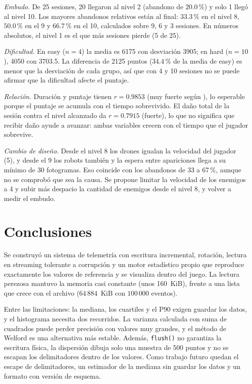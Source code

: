 \documentclass[conference]{IEEEtran}
\begin{document}
\emph{Embudo.} De 25 sesiones, 20 llegaron al nivel 2 (abandono de $20.0\,\%$) y solo 1 llegó al nivel 10. Los mayores abandonos relativos están al final: $33.3\,\%$ en el nivel 8, $50.0\,\%$ en el 9 y $66.7\,\%$ en el 10, calculados sobre 9, 6 y 3 sesiones. En números absolutos, el nivel 1 es el que más sesiones pierde (5 de 25).

\emph{Dificultad.} En easy ($n=4$) la media es 6175 con desviación 3905; en hard ($n=10$), 4050 con 3703.5. La diferencia de 2125 puntos ($34.4\,\%$ de la media de easy) es menor que la desviación de cada grupo, así que con 4 y 10 sesiones no se puede afirmar que la dificultad afecte el puntaje.

\emph{Relación.} Duración y puntaje tienen $r=0.9853$ (muy fuerte según \cite{evans}), lo esperable porque el puntaje se acumula con el tiempo sobrevivido. El daño total de la sesión contra el nivel alcanzado da $r=0.7915$ (fuerte), lo que no significa que recibir daño ayude a avanzar: ambas variables crecen con el tiempo que el jugador sobrevive.

\emph{Cambio de diseño.} Desde el nivel 8 los drones igualan la velocidad del jugador (5), y desde el 9 los robots también y la espera entre apariciones llega a su mínimo de 30 fotogramas. Eso coincide con los abandonos de 33 a 67\,\%, aunque no se comprobó que sea la causa. Se propone limitar la velocidad de los enemigos a 4 y subir más despacio la cantidad de enemigos desde el nivel 8, y volver a medir el embudo.

\section{Conclusiones}
Se construyó un sistema de telemetría con escritura incremental, rotación, lectura en streaming tolerante a corrupción y un motor estadístico propio que reproduce exactamente los valores de referencia y se visualiza dentro del juego. La lectura perezosa mantuvo la memoria casi constante (unos 160~KiB), frente a una lista que crece con el archivo ($64\,884$~KiB con $100\,000$ eventos).

Entre las limitaciones: la mediana, los cuartiles y el P90 exigen guardar los datos, y el histograma necesita dos recorridos. La varianza calculada con suma de cuadrados puede perder precisión con valores muy grandes, y el método de Welford \cite{welford} es una alternativa más estable. Además, \texttt{flush()} no garantiza la escritura física, la dispersión dibuja solo una muestra de 500 puntos y no se escapan los delimitadores dentro de los valores. Como trabajo futuro quedan el escape de delimitadores, un estimador de la mediana sin guardar los datos y un formato con versión de esquema.
\end{document}
